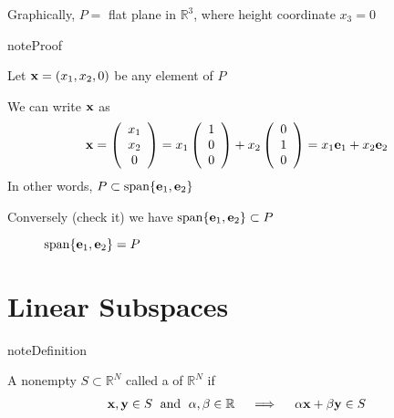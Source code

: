 \documentclass[letterpaper,10pt,english]{jupyterBook}
\begin{document}
\sphinxAtStartPar
Graphically, \(P =\) flat plane in \(\mathbb{R}^3\), where height coordinate \(x_3=0\)

\begin{figure}[htbp]
\centering

\noindent{}
\end{figure}

\begin{sphinxadmonition}{note}{Proof}

\sphinxAtStartPar
Let \({\bf x} = (x_1, x_2, 0)\) be any element of \(P\)

\sphinxAtStartPar
We can write \({\bf x}\) as
\begin{equation*}
\begin{split}
%
{\bf x} = 
\left(
\begin{array}{c}
x_1 \\
x_2 \\
0
\end{array}
\right)
=
x_1
\left(
\begin{array}{c}
1 \\
0 \\
0
\end{array}
\right)
+ 
x_2
\left(
\begin{array}{c}
0 \\
1 \\
0
\end{array}
\right)
= x_1 {\bf e}_1 + x_2 {\bf e}_2
%
\end{split}
\end{equation*}
\sphinxAtStartPar
In other words, \(P \subset \mathrm{span}\{{\bf e}_1, {\bf e}_2\}\)

\sphinxAtStartPar
Conversely (check it) we have \(\mathrm{span}\{{\bf e}_1, {\bf e}_2\} \subset P\)
\end{sphinxadmonition}

\begin{figure}[htbp]
\centering
\capstart

\noindent{}
\caption{\(\mathrm{span}\{{\bf e}_1, {\bf e}_2\} = P\)}\label{\detokenize{05.linear_algebra:id4}}\end{figure}


\section{Linear Subspaces}
\label{\detokenize{05.linear_algebra:linear-subspaces}}
\begin{sphinxadmonition}{note}{Definition}

\sphinxAtStartPar
A nonempty \(S \subset \mathbb{R}^N\) called a  of \(\mathbb{R}^N\) if
\begin{equation*}
\begin{split}
%
{\bf x}, {\bf y} \in S \; \text{ and } \;\alpha, \beta \in \mathbb{R}
\quad \implies \quad
\alpha {\bf x} + \beta {\bf y} \in S 
%
\end{split}
\end{equation*}\end{sphinxadmonition}
\end{document}
